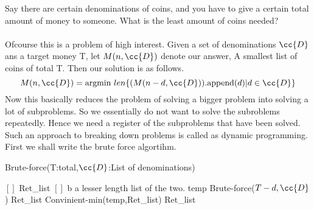 \documentclass{myclass}
\begin{document}
 Say there are certain denominations of coins, and you have to give a certain 
total amount of money to someone. What is the least amount of coins needed?
\\\\
Ofcourse this is a problem of high interest. Given a set of denominations $\cc{D}$ ans a target money T,
let $M(n,\cc{D})$ denote our answer, A smallest list of coins of total T. Then our solution is as follows.
$$M(n,\cc{D}) = \text{argmin }len\{(M(n-d,\cc{D})).\text{append}(d)|d\in\cc{D}\}$$
Now this basically reduces the problem of solving a bigger problem into solving a lot of subproblems.
So we essentially do not want to solve the subroblems repeatedly. Hence we need a register of the subproblems that have been solved.
Such an approach to breaking down problems is called as dynamic programming. First we shall write the brute force algortihm.

\vspace{-0.1cm}
\begin{algorithm}
    \caption*{Brute-force(T:total,$\cc{D}$:List of denominations)}
    \begin{algorithmic}[1]
            \State {} $[]$
        \EndIf
        \State Ret\_list \ass $[]$
                \State {} b
                \State {} a
            \Else 
                \State {} lesser length list of the two.
            \EndIf
        \EndProcedure
            \State temp \ass Brute-force($T-d,\cc{D}$)
            \State Ret\_list \ass Convinient-min(temp,Ret\_list)
        \EndFor
        \State {} Ret\_list
    \end{algorithmic}
\end{algorithm}

\newpage
\end{document}
